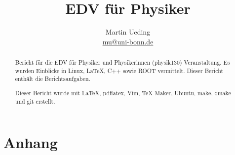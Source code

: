 \documentclass[12pt]{report}
\title{EDV für Physiker}
\author{Martin Ueding \\ \href{mailto:mu@uni-bonn.de}{mu@uni-bonn.de}}
\newcommand\gqq[1]{\glqq #1\grqq}
\begin{document}
\maketitle

\begin{abstract}
Bericht für die \gqq{EDV für Physiker und Physikerinnen} (physik130) Veranstaltung. Es wurden Einblicke in Linux, \LaTeX, C++ sowie ROOT vermittelt. Dieser Bericht enthält die Berichtsaufgaben.

Dieser Bericht wurde mit \LaTeX, pdflatex, Vim, TeX Maker, Ubuntu, make, qmake und git erstellt.
\end{abstract}

\newpage

\tableofcontents
\newpage








\part{Anhang}

\lstlistoflistings
\end{document}
